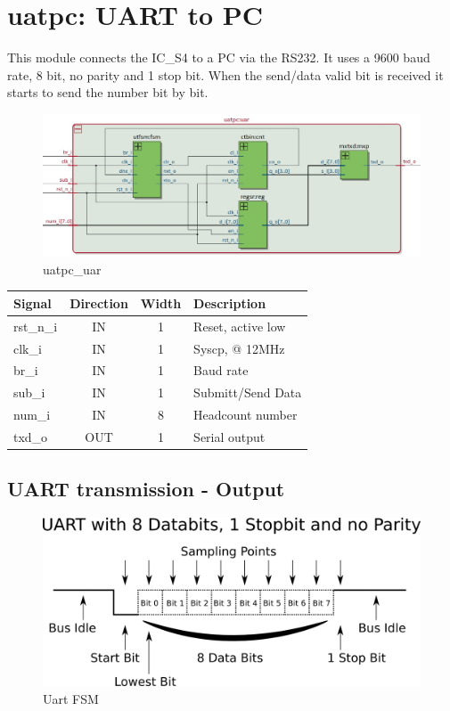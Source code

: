 \documentclass[12pt,a4 paper] {report}
\begin{document}
\section{uatpc: UART to PC}
This module connects the IC\_S4 to a PC via the RS232. It uses a 9600 baud rate, 8 bit, no parity and 1 stop bit. When 
the send/data valid bit is received it starts to send the number bit by bit.
\begin{figure}[h]
	\centering	
	\includegraphics[scale=0.3]{../png/uatpc_uar.png}
	\caption{uatpc\_uar}
\end{figure}
\begin{center}
	\begin{tabular}{ | p{2cm} | c | c | p{5cm} |}
		\hline
		\textbf{Signal} & \textbf{Direction} & \textbf{Width} & \textbf{Description} \\
		\hline	
  	rst\_n\_i & IN & 1 & Reset, active low\\
  	\hline
		clk\_i & IN & 1 & Syscp, @ 12MHz \\
		\hline
		br\_i & IN & 1 & Baud rate \\
		\hline
		sub\_i & IN & 1 & Submitt/Send Data \\
		\hline
		num\_i & IN & 8 & Headcount number \\
		\hline
		txd\_o & OUT & 1 & Serial output \\
		\hline
	\end{tabular}
\end{center}
\subsection*{UART transmission - Output}
\begin{figure}[h]
	\centering	
	\includegraphics[scale=0.5]{../png/rs232image.png}
	\caption{Uart FSM}
\end{figure}
\end{document}
